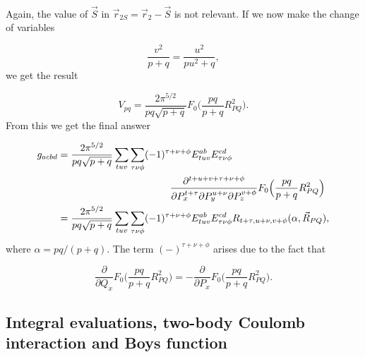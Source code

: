 \documentclass[%
twoside,                 %
final,                   %
10pt]{article}
\begin{document}
\paragraph{}

Again, the value of $\vec S$ in $\vec r_{2S} = \vec r_2 - \vec S$ is not relevant. If we now make the change of variables

\begin{equation}
 \frac{v^2}{p+q} = \frac{u^2}{pu^2+q},
\end{equation}
we get the result

\begin{equation}
 V_{pq} = \frac{2\pi^{5/2}}{pq\sqrt{p+q}}F_0\Big(\frac{pq}{p+q}R^2_{PQ}\Big).
\end{equation}
From this we get the final answer

\begin{equation}
\begin{split}
 g_{acbd} & = \frac{2\pi^{5/2}}{pq\sqrt{p+q}}\sum_{tuv}\sum_{\tau\nu\phi}(-1)^{\tau+\nu+\phi}E^{ab}_{tuv}E^{cd}_{\tau\nu\phi} \\
          & \hspace{40mm} \frac{\partial^{t+u+v+\tau+\nu+\phi}}{\partial P_x^{t+\tau} \partial P_y^{u+\nu} \partial P_z^{v+\phi}}F_0\Big(\frac{pq}{p+q}R^2_{PQ}\Big) \\
          & = \frac{2\pi^{5/2}}{pq\sqrt{p+q}}\sum_{tuv}\sum_{\tau\nu\phi}(-1)^{\tau+\nu+\phi}E^{ab}_{tuv}E^{cd}_{\tau\nu\phi}R_{t+\tau,u+\nu,v+\phi}(\alpha,\vec R_{PQ}),
\end{split}
\end{equation}
where $\alpha = pq/(p+q)$. The term $(-)^{\tau+\nu+\phi}$ arises due to the fact that

\begin{equation}
\frac{\partial}{\partial Q_x} F_0\Big(\frac{pq}{p+q}R^2_{PQ}\Big) = - \frac{\partial}{\partial P_x} F_0\Big(\frac{pq}{p+q}R^2_{PQ}\Big).
\end{equation}



\subsection*{Integral evaluations, two-body Coulomb interaction and Boys function}

\paragraph{}
\end{document}
